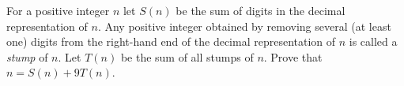 For a positive integer $n$ let $S(n)$ be the sum of digits in the decimal representation of $n$.   Any positive integer obtained by removing several (at least one) digits from the right-hand end of the decimal representation of $n$ is called a \emph{stump} of $n$. Let $T(n)$ be the sum of all stumps of $n$. Prove that $n=S(n)+9T(n)$.